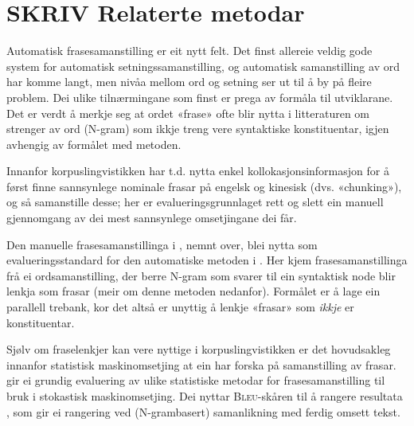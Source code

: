 \documentclass[11pt,a4paper,oneside,draft]{book}
\newcommand{\Bleu}{\textsc{Bleu}}
\begin{document}
  \label{SEC:bakgrunn}
\section{\textbf{SKRIV} Relaterte metodar}
\label{sec-2.1}

Automatisk frasesamanstilling er eit nytt felt. Det finst allereie
veldig gode system for automatisk setningssamanstilling, og automatisk
samanstilling av ord har komme langt, men nivåa mellom ord og setning
ser ut til å by på fleire problem.  Dei ulike tilnærmingane
som finst er prega av formåla til utviklarane. Det er verdt å merkje
seg at ordet «frase» ofte blir nytta i litteraturen om strenger av ord
(N-gram) som ikkje treng vere syntaktiske konstituentar, igjen
avhengig av formålet med metoden.

Innanfor korpuslingvistikken har t.d. \citet{piao2001mwu} nytta enkel
kollokasjonsinformasjon for å først finne sannsynlege nominale frasar
på engelsk og kinesisk (dvs. «chunking»), og så samanstille desse; her
er evalueringsgrunnlaget rett og slett ein manuell gjennomgang av dei
mest sannsynlege omsetjingane dei får. 

Den manuelle frasesamanstillinga i \citet{samuelsson2006pap}, nemnt
over, blei nytta som evalueringsstandard for den automatiske metoden i
\citet{samuelsson2007apa}.  Her kjem frasesamanstillinga frå ei
ordsamanstilling, der berre N-gram som svarer til ein syntaktisk node
blir lenkja som frasar (meir om denne metoden nedanfor). Formålet er å
lage ein parallell trebank, kor det altså er unyttig å lenkje «frasar»
som \emph{ikkje} er konstituentar.

Sjølv om fraselenkjer kan vere nyttige i korpuslingvistikken er det
hovudsakleg innanfor statistisk maskinomsetjing at ein har forska på
samanstilling av frasar. \citet{koehn2003spb} gir ei grundig
evaluering av ulike statistiske metodar for frasesamanstilling til
bruk i stokastisk maskinomsetjing. Dei nyttar \Bleu-skåren til å
rangere resultata
\citep[Papineni~et~al.,~2001,~i][s.~51]{koehn2003spb}, som gir ei
rangering ved (N-grambasert) samanlikning med ferdig omsett tekst.
\end{document}
